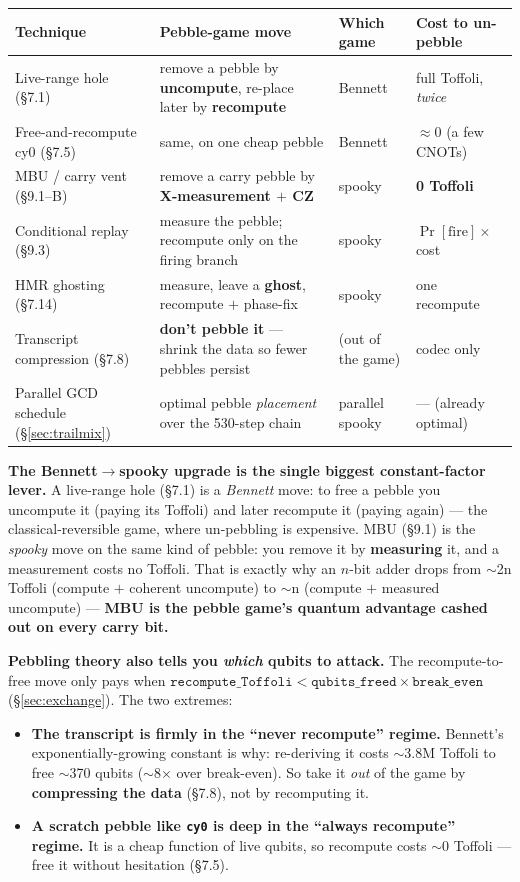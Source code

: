 \documentclass[11pt,a4paper]{article}
\begin{document}
\begin{center}
\small
\begin{tabular}{p{3.4cm}p{5.2cm}p{2.4cm}p{2.6cm}}
\toprule
\textbf{Technique} & \textbf{Pebble-game move} & \textbf{Which game} & \textbf{Cost to un-pebble} \\
\midrule
Live-range hole (\S7.1) & remove a pebble by \textbf{uncompute}, re-place later by \textbf{recompute} & Bennett & full Toffoli, \emph{twice} \\
Free-and-recompute cy0 (\S7.5) & same, on one cheap pebble & Bennett & $\approx$0 (a few CNOTs) \\
MBU / carry vent (\S9.1--B) & remove a carry pebble by \textbf{X-measurement $+$ CZ} & spooky & \textbf{0 Toffoli} \\
Conditional replay (\S9.3) & measure the pebble; recompute only on the firing branch & spooky & $\Pr[\text{fire}] \times$ cost \\
HMR ghosting (\S7.14) & measure, leave a \textbf{ghost}, recompute $+$ phase-fix & spooky & one recompute \\
Transcript compression (\S7.8) & \textbf{don't pebble it} --- shrink the data so fewer pebbles persist & (out of the game) & codec only \\
Parallel GCD schedule (\S\ref{sec:trailmix}) & optimal pebble \emph{placement} over the 530-step chain & parallel spooky & --- (already optimal) \\
\bottomrule
\end{tabular}
\end{center}

\textbf{The Bennett$\to$spooky upgrade is the single biggest constant-factor lever.} A live-range
hole (\S7.1) is a \emph{Bennett} move: to free a pebble you uncompute it (paying its Toffoli) and
later recompute it (paying again) --- the classical-reversible game, where un-pebbling is expensive.
MBU (\S9.1) is the \emph{spooky} move on the same kind of pebble: you remove it by \textbf{measuring}
it, and a measurement costs no Toffoli. That is exactly why an $n$-bit adder drops from $\sim$2n
Toffoli (compute $+$ coherent uncompute) to $\sim$n (compute $+$ measured uncompute) --- \textbf{MBU
is the pebble game's quantum advantage cashed out on every carry bit.}

\textbf{Pebbling theory also tells you \emph{which} qubits to attack.} The recompute-to-free move
only pays when $\texttt{recompute\_Toffoli} < \texttt{qubits\_freed} \times \texttt{break\_even}$
(\S\ref{sec:exchange}). The two extremes:
\begin{itemize}
  \item \textbf{The transcript is firmly in the ``never recompute'' regime.} Bennett's
    exponentially-growing constant is why: re-deriving it costs $\sim$3.8M Toffoli to free $\sim$370
    qubits ($\sim$8$\times$ over break-even). So take it \emph{out} of the game by \textbf{compressing
    the data} (\S7.8), not by recomputing it.
  \item \textbf{A scratch pebble like \texttt{cy0} is deep in the ``always recompute'' regime.} It is
    a cheap function of live qubits, so recompute costs $\sim$0 Toffoli --- free it without hesitation
    (\S7.5).
\end{itemize}
\end{document}
